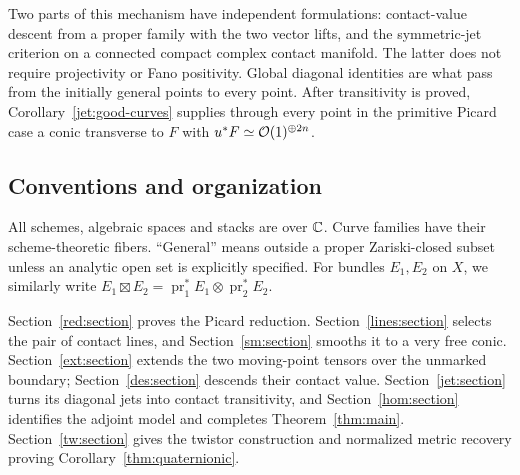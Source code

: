 Two parts of this mechanism have independent formulations:
contact-value descent from a proper family with the two vector
lifts, and the symmetric-jet criterion on a connected compact
complex contact manifold. The latter does not require projectivity
or Fano positivity. Global diagonal identities are what pass
from the initially general points to every point. After
transitivity is proved, Corollary~\ref{jet:good-curves} supplies
through every point in the primitive Picard case a conic transverse
to $F$ with $u^*F\simeq\mathcal O(1)^{\oplus2n}$.

\subsection*{Conventions and organization}

All schemes, algebraic spaces and stacks are over $\mathbb C$.
Curve families have their
scheme-theoretic fibers. ``General'' means outside a proper
Zariski-closed subset unless an analytic open set is explicitly
specified. For bundles $E_1,E_2$ on $X$, we similarly write
$E_1\boxtimes E_2=\operatorname{pr}_1^*E_1\otimes
\operatorname{pr}_2^*E_2$.

Section~\ref{red:section} proves the Picard reduction.
Section~\ref{lines:section} selects the pair of contact lines,
and Section~\ref{sm:section} smooths it to a very free conic.
Section~\ref{ext:section} extends the two moving-point tensors
over the unmarked boundary; Section~\ref{des:section} descends
their contact value. Section~\ref{jet:section} turns its diagonal
jets into contact transitivity, and Section~\ref{hom:section}
identifies the adjoint model and completes Theorem~\ref{thm:main}.
Section~\ref{tw:section} gives the twistor construction and
normalized metric recovery proving Corollary~\ref{thm:quaternionic}.
